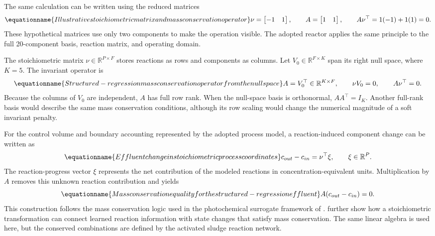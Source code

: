 The same calculation can be written using the reduced matrices
\begin{equation}
\equationname{Illustrative stoichiometric matrix and mass conservation operator}
\label{eq:icsor_small_inventory_matrices}
\nu=\begin{bmatrix}-1&1\end{bmatrix},
\qquad
A=\begin{bmatrix}1&1\end{bmatrix},
\qquad
A\nu^\top=1(-1)+1(1)=0.
\end{equation}
These hypothetical matrices use only two components to make the operation visible. The adopted reactor applies the same principle to the full 20-component basis, reaction matrix, and operating domain.

The stoichiometric matrix \(\nu\in\mathbb{R}^{P\times F}\) stores reactions as rows and components as columns. Let \(V_0\in\mathbb{R}^{F\times K}\) span its right null space, where \(K=5\). The invariant operator is
\begin{equation}
\equationname{Structured-regression mass conservation operator from the null space}
\label{eq:icsor_invariant_operator}
A=V_0^\top\in\mathbb{R}^{K\times F},
\qquad \nu V_0=0,
\qquad A\nu^\top=0.
\end{equation}
Because the columns of \(V_0\) are independent, \(A\) has full row rank. When the null-space basis is orthonormal, \(AA^\top=I_K\). Another full-rank basis would describe the same mass conservation conditions, although its row scaling would change the numerical magnitude of a soft invariant penalty.

For the control volume and boundary accounting represented by the adopted process model, a reaction-induced component change can be written as
\begin{equation}
\equationname{Effluent change in stoichiometric process coordinates}
\label{eq:icsor_stoichiometric_change}
c_{out}-c_{in}=\nu^\top\xi,
\qquad \xi\in\mathbb{R}^{P}.
\end{equation}
The reaction-progress vector \(\xi\) represents the net contribution of the modeled reactions in concentration-equivalent units. Multiplication by \(A\) removes this unknown reaction contribution and yields
\begin{equation}
\equationname{Mass conservation equality for the structured-regression effluent}
\label{eq:icsor_invariant_balance}
A(c_{out}-c_{in})=0.
\end{equation}
This construction follows the mass conservation logic used in the photochemical surrogate framework of \citet{SturmWexler2020}. \citet{SturmWexler2022} further show how a stoichiometric transformation can connect learned reaction information with state changes that satisfy mass conservation. The same linear algebra is used here, but the conserved combinations are defined by the activated sludge reaction network.

